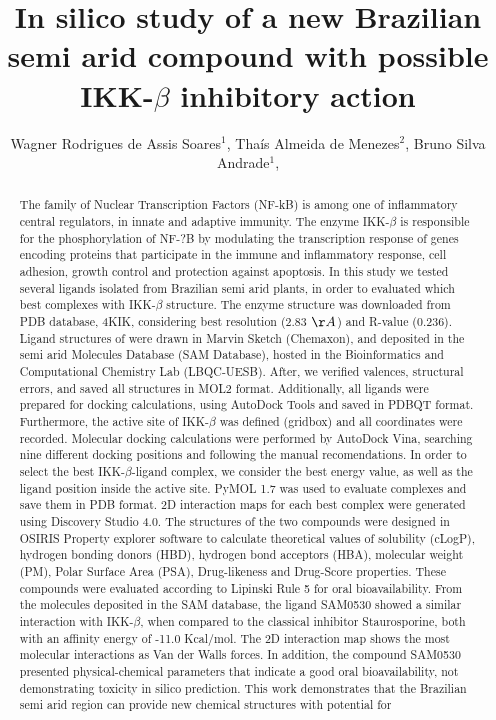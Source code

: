 \documentclass[twoside]{article}
\title{\vspace{-15mm}\fontsize{24pt}{10pt}\selectfont\textbf{ In silico study of a new Brazilian semi arid compound with possible IKK-$\beta$ inhibitory action }} %
\author{ Wagner Rodrigues de Assis Soares$^{1}$, Thaís Almeida de Menezes$^{2}$, Bruno Silva Andrade$^{1}$, }
\affil{ 1 Universidade Estadual do Sudoeste da Bahia

2 Universidade Estadual de Feira de Santana

 }
\date{}
\begin{document}
  
  
  \maketitle %
  
  
  \thispagestyle{fancy} %
  
  
  \begin{abstract}
  The family of Nuclear Transcription Factors (NF-kB) is among one of inflammatory central regulators, in innate and adaptive immunity. The enzyme IKK-$\beta$ is responsible for the phosphorylation of NF-?B by modulating the transcription response of genes encoding proteins that participate in the immune and inflammatory response, cell adhesion, growth control and protection against apoptosis. In this study we tested several ligands isolated from Brazilian semi arid plants, in order to evaluated which best complexes with IKK-$\beta$ structure. The enzyme structure was downloaded from PDB database, 4KIK, considering best resolution (2.83 $\AA$) and R-value (0.236). Ligand structures of were drawn in Marvin Sketch (Chemaxon), and deposited in the semi arid Molecules Database (SAM Database), hosted in the Bioinformatics and Computational Chemistry Lab (LBQC-UESB). After, we verified valences, structural errors, and saved all structures in MOL2 format. Additionally, all ligands were prepared for docking calculations, using AutoDock Tools and saved in PDBQT format. Furthermore, the active site of IKK-$\beta$ was defined (gridbox) and all coordinates were recorded. Molecular docking calculations were performed by AutoDock Vina, searching nine different docking positions and following the manual recomendations. In order to select the best IKK-$\beta$-ligand complex, we consider the best energy value, as well as the ligand position inside the active site. PyMOL 1.7 was used to evaluate complexes and save them in PDB format. 2D interaction maps for each best complex were generated using Discovery Studio 4.0. The structures of the two compounds were designed in OSIRIS Property explorer software to calculate theoretical values of solubility (cLogP), hydrogen bonding donors (HBD), hydrogen bond acceptors (HBA), molecular weight (PM), Polar Surface Area (PSA), Drug-likeness and Drug-Score properties. These compounds were evaluated according to Lipinski Rule 5 for oral bioavailability. From the molecules deposited in the SAM database, the ligand SAM0530 showed a similar interaction with IKK-$\beta$, when compared to the classical inhibitor Staurosporine, both with an affinity energy of -11.0 Kcal/mol. The 2D interaction map shows the most molecular interactions as Van der Walls forces. In addition, the compound SAM0530 presented physical-chemical parameters that indicate a good oral bioavailability, not demonstrating toxicity in silico prediction. This work demonstrates that the Brazilian semi arid region can provide new chemical structures with potential for 
\end{abstract}
\end{document}
